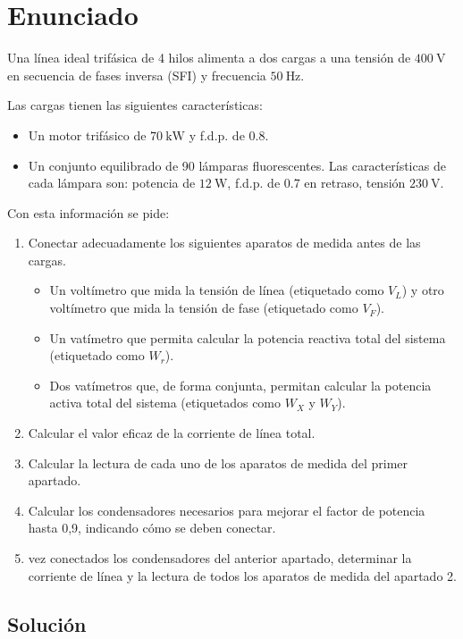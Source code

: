 \section{Enunciado}

Una línea ideal trifásica de 4 hilos alimenta a dos cargas a una
tensión de $\SI{400}{\volt}$ en secuencia de fases inversa (SFI) y
frecuencia $\SI{50}{\hertz}$.

Las cargas tienen las siguientes características:

\begin{itemize}
\item Un motor trifásico de $\SI{70}{\kilo\watt}$ y f.d.p. de 0.8.
\item Un conjunto equilibrado de 90 lámparas fluorescentes. Las
  características de cada lámpara son: potencia de $\SI{12}{\watt}$,
  f.d.p. de 0.7 en retraso, tensión $\SI{230}{\volt}$.
\end{itemize}

Con esta información se pide:

\begin{enumerate}
\item Conectar adecuadamente los siguientes aparatos de medida antes
  de las cargas.
  \begin{itemize}
  \item Un voltímetro que mida la tensión de línea (etiquetado como
    $V_L$) y otro voltímetro que mida la tensión de fase (etiquetado
    como $V_F$).
  \item Un vatímetro que permita calcular la potencia reactiva total
    del sistema (etiquetado como $W_r$).
  \item Dos vatímetros que, de forma conjunta, permitan calcular la
    potencia activa total del sistema (etiquetados como $W_X$ y
    $W_Y$).
  \end{itemize}
\item Calcular el valor eficaz de la corriente de línea
  total.
\item Calcular la lectura de cada uno de los aparatos
  de medida del primer apartado.
\item Calcular los condensadores necesarios para
  mejorar el factor de potencia hasta 0,9, indicando cómo se deben
  conectar.
\item vez conectados los condensadores del anterior
  apartado, determinar la corriente de línea y la lectura de todos los
  aparatos de medida del apartado 2.
\end{enumerate}

\subsection*{Solución}

